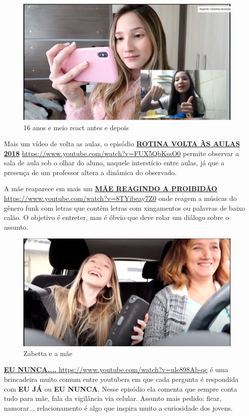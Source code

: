 \begin{figure}[h!]
    \centering
    \includegraphics[width=0.7\linewidth]{fig/Zabetta-16-anos3-antes-depois}
    \caption{16 anos  e meio react antes e depois}
    \label{fig:zabetta-16-anos3-antes-depois}
\end{figure}

Mais um vídeo de volta as aulas, o episódio \href{https://www.youtube.com/watch?v=FUX5QbKssO0}{\textbf{ROTINA VOLTA ÀS AULAS 2018}} \url{https://www.youtube.com/watch?v=FUX5QbKssO0} permite observar a sala de aula sob o olhar do aluno, naquele interstício entre aulas, já que a presença de um professor altera a dinâmica do observado.

A mãe reaparece em mais um \href{https://www.youtube.com/watch?v=8TYibeay7Z0}{\textbf{MÃE REAGINDO A PROIBIDÃO}} \url{https://www.youtube.com/watch?v=8TYibeay7Z0} onde reagem a músicas do gênero funk com letras que contêm letras com xingamentos ou palavras de baixo calão. O objetivo é entreter, mas é óbvio que deve rolar um diálogo sobre o assunto.

\begin{figure}[h!]
    \centering
    \includegraphics[width=0.7\linewidth]{fig/Zabetta-16-anos-mae}
    \caption{Zabetta e a mãe}
    \label{fig:zabetta-16-anos-mae}
\end{figure}

\href{https://www.youtube.com/watch?v=ule898Ab-qc}{\textbf{EU NUNCA.... }} \url{https://www.youtube.com/watch?v=ule898Ab-qc} é uma brincadeira muito comum entre youtubers em que cada pergunta é respondida com \textbf{EU JÁ} ou \textbf{EU NUNCA}. Nesse episódio ela comenta que sempre conta tudo para mãe, fala da vigilância via celular. Assunto mais pedido: ficar, namorar... relacionamento é algo que inspira muito a curiosidade dos jovens.

